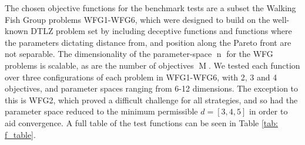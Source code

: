 \documentclass[conference]{IEEEtran}
\DeclareMathOperator*{\ndim}{n}
\DeclareMathOperator*{\nobj}{M}
\begin{document}

The chosen objective functions for the benchmark tests are a subset the Walking Fish Group problems \cite{huband2005scalable} WFG1-WFG6, which were designed to build on the well-known DTLZ problem set \cite{deb2005scalable} by including deceptive functions and functions where the parameters dictating distance from, and position along the Pareto front are not separable. The dimensionality of the parameter-space $\ndim$ for the WFG problems is scalable, as are the number of objectives $\nobj$. We tested each function over three configurations of each problem in WFG1-WFG6, with 2, 3 and 4 objectives, and parameter spaces ranging from 6-12 dimensions. The exception to this is WFG2, which proved a difficult challenge for all strategies, and so had the parameter space reduced to the minimum permissible $d=[3, 4, 5]$ in order to aid convergence. A full table of the test functions can be seen in Table \ref{tab: f_table}.
\end{document}
